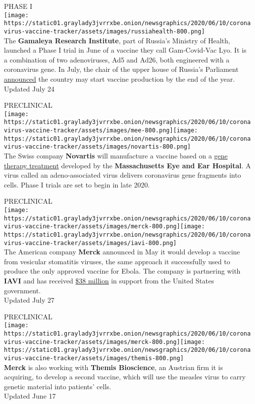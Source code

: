 PHASE I\\
\texttt{[image: https://static01.graylady3jvrrxbe.onion/newsgraphics/2020/06/10/coronavirus-vaccine-tracker/assets/images/russiahealth-800.png]}\\
The \textbf{Gamaleya Research Institute}, part of Russia's Ministry of
Health, launched a Phase I trial in June of a vaccine they call
Gam-Covid-Vac Lyo. It is a combination of two adenoviruses, Ad5 and
Ad26, both engineered with a coronavirus gene. In July, the chair of the
upper house of Russia's Parliament
\href{https://tass.com/society/1181659}{announced} the country may start
vaccine production by the end of the year.\\
Updated July 24

PRECLINICAL\\
\texttt{[image: https://static01.graylady3jvrrxbe.onion/newsgraphics/2020/06/10/coronavirus-vaccine-tracker/assets/images/mee-800.png]}\texttt{[image: https://static01.graylady3jvrrxbe.onion/newsgraphics/2020/06/10/coronavirus-vaccine-tracker/assets/images/novartis-800.png]}\\
The Swiss company \textbf{Novartis} will manufacture a vaccine based on
a
\href{https://www.nytimes3xbfgragh.onion/2020/05/04/health/gene-therapy-harvard-coronavirus.html}{gene
therapy treatment} developed by the \textbf{Massachusetts Eye and Ear
Hospital}. A virus called an adeno-associated virus delivers coronavirus
gene fragments into cells. Phase I trials are set to begin in late 2020.

PRECLINICAL\\
\texttt{[image: https://static01.graylady3jvrrxbe.onion/newsgraphics/2020/06/10/coronavirus-vaccine-tracker/assets/images/merck-800.png]}\texttt{[image: https://static01.graylady3jvrrxbe.onion/newsgraphics/2020/06/10/coronavirus-vaccine-tracker/assets/images/iavi-800.png]}\\
The American company \textbf{Merck} announced in May it would develop a
vaccine from vesicular stomatitis viruses, the same approach it
successfully used to produce the only approved vaccine for Ebola. The
company is partnering with \textbf{IAVI} and has received
\href{https://medicalcountermeasures.gov/newsroom/2020/merck-iavi/}{\$38
million} in support from the United States government.\\
Updated July 27

PRECLINICAL\\
\texttt{[image: https://static01.graylady3jvrrxbe.onion/newsgraphics/2020/06/10/coronavirus-vaccine-tracker/assets/images/merck-800.png]}\texttt{[image: https://static01.graylady3jvrrxbe.onion/newsgraphics/2020/06/10/coronavirus-vaccine-tracker/assets/images/themis-800.png]}\\
\textbf{Merck} is also working with \textbf{Themis Bioscience}, an
Austrian firm it is acquiring, to develop a second vaccine, which will
use the measles virus to carry genetic material into patients' cells.\\
Updated June 17

